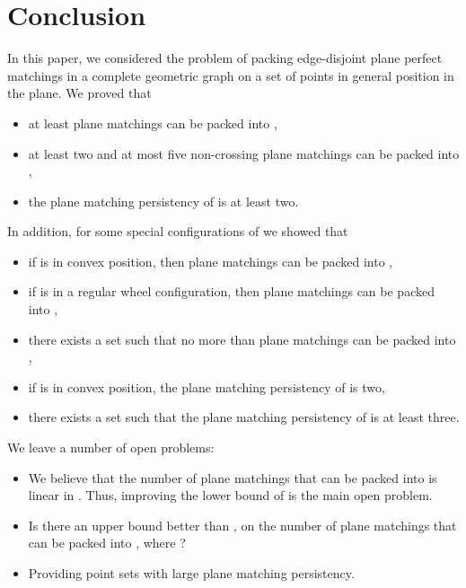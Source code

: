 \documentclass[11pt,a4paper]{article}
\begin{document}
\section{Conclusion}
\label{conclusion}
In this paper, we considered the problem of packing edge-disjoint plane perfect matchings in a complete geometric graph  on a set  of  points in general position in the plane. We proved that
\begin{itemize}
  \item at least  plane matchings can be packed into ,
  \item at least two and at most five non-crossing plane matchings can be packed into ,
  \item the plane matching persistency of  is at least two.
\end{itemize}
In addition, for some special configurations of  we showed that
\begin{itemize}
  \item if  is in convex position, then  plane matchings can be packed into ,
  \item if  is in a regular wheel configuration, then  plane matchings can be packed into ,
  \item there exists a set  such that no more than  plane matchings can be packed into ,
  \item if  is in convex position, the plane matching persistency of  is two,
  \item there exists a set  such that the plane matching persistency of  is at least three.
\end{itemize}

We leave a number of open problems:
\begin{itemize}
  \item We believe that the number of plane matchings that can be packed into  is linear in . Thus, improving the lower bound of  is the main open problem.
  \item Is there an upper bound better than , on the number of plane matchings that can be packed into , where ?
  \item Providing point sets with large plane matching persistency.
\end{itemize}
 


\end{document}
